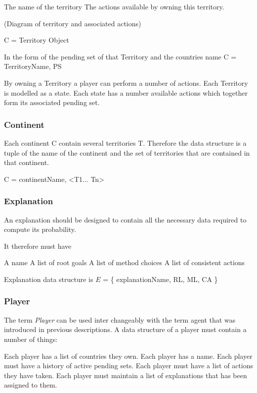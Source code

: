 \documentclass[parskip]{cs4rep}
\begin{document}
The name of the territory
The actions available by owning this territory.

(Diagram of territory and associated actions)

C = Territory Object

In the form of the pending set of that Territory and the countries name C = { TerritoryName, PS }

By owning a Territory a player can perform a number of actions.
Each Territory is modelled as a state. Each state has a number available actions which together form its associated pending set. \newline

\subsubsection{Continent}

Each continent C contain several territories T. Therefore the data structure is a tuple of the name of the continent and the set of territories that are contained in that continent.

C = {continentName, <T1... Tn>}

\subsubsection{Explanation}

An explanation should be designed to contain all the necessary data required to compute its probability.

It therefore must have

A name
A list of root goals
A list of method choices
A list of consistent actions

Explanation data structure is $E$ = \{ explanationName, RL, ML, CA \}

\subsubsection{Player}

The term \textit{Player} can be used inter changeably with the term agent that was introduced in previous descriptions. A data structure of a player must contain a number of things:

Each player has a list of countries they own.
Each player has a name.
Each player must have a history of active pending sets.
Each player must have a list of actions they have taken.
Each player must maintain a list of explanations that has been assigned to them.
\end{document}
